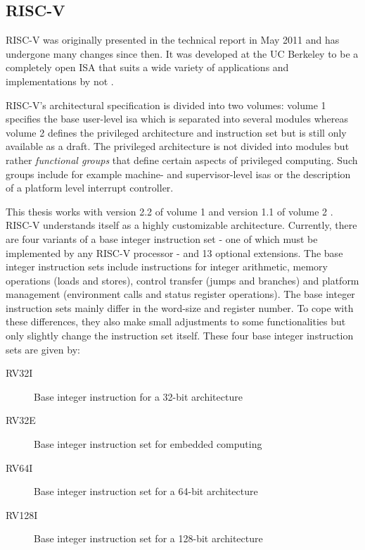 \subsection{RISC-V}
\label{sec:bg-riscv}

RISC-V was originally presented in the technical report  in May 2011 \cite{RiscVISA-org} and has undergone many changes since then.
It was developed at the UC Berkeley to be a completely open ISA that suits a wide variety of applications and implementations by not .

RISC-V's architectural specification is divided into two volumes: volume 1 specifies the base user-level \gls{isa} which is separated into several modules whereas volume 2 defines the privileged architecture and instruction set but is still only available as a draft.
The privileged architecture is not divided into modules but rather \textit{functional groups} that define certain aspects of privileged computing.
Such groups include for example machine- and supervisor-level \glspl{isa} or the description of a platform level interrupt controller.

This thesis works with version 2.2 of volume 1 \cite{RiscVISA} and version 1.1 of volume 2 \cite{RiscVISAP}.
RISC-V understands itself as a highly customizable architecture.
Currently, there are four variants of a base integer instruction set - one of which must be implemented by any RISC-V processor - and 13 optional extensions.
The base integer instruction sets include instructions for integer arithmetic, memory operations (loads and stores), control transfer (jumps and branches) and platform management (environment calls and status register operations).
The base integer instruction sets mainly differ in the word-size and register number.
To cope with these differences, they also make small adjustments to some functionalities but only slightly change the instruction set itself.
These four base integer instruction sets are given by:
\begin{description}
    \item[RV32I] Base integer instruction  for a 32-bit architecture
    \item[RV32E] Base integer instruction set for embedded computing
    \item[RV64I] Base integer instruction set for a 64-bit architecture
    \item[RV128I] Base integer instruction set for a 128-bit architecture
\end{description}

